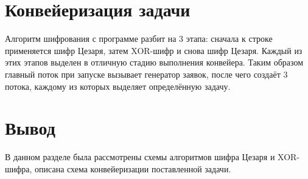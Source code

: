 \section{Конвейеризация задачи}
Алгоритм шифрования с программе разбит на 3 этапа: сначала к строке применяется шифр Цезаря, затем XOR-шифр и снова шифр Цезаря. Каждый из этих этапов выделен в отличную стадию выполнения конвейера. Таким образом главный поток при запуске вызывает генератор заявок, после чего создаёт 3 потока, каждому из которых выделяет определённую задачу.

\section{Вывод}
В данном разделе была рассмотрены схемы алгоритмов шифра Цезаря и XOR-шифра, описана схема конвейеризации поставленной задачи.